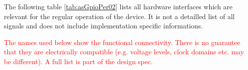 The following table \ref{tab:asGpioPer02} lists all hardware interfaces which are relevant for the regular operation of the device. It is not a detailled list of all signals and does not include implementation specific informations.

\textcolor{red}{The names used below show the functional connectivity. There is no guarantee that they are electrically compatible (e.g. voltage levels, clock domains etc. may be different). A full list is part of the design spec.}
